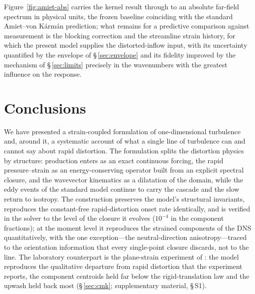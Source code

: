 \documentclass[lineno]{JFM-FLM_Au}
\begin{document}
Figure~\ref{fig:amiet-abs} carries the kernel result through to an
absolute far-field spectrum in physical units, the frozen baseline
coinciding with the standard Amiet--von K\'arm\'an prediction; what
remains for a predictive comparison against measurement is the
blocking correction and the streamline strain history, for which the
present model supplies the distorted-inflow input, with its
uncertainty quantified by the envelope of \S\,\ref{sec:envelope} and
its fidelity improved by the mechanism of \S\,\ref{sec:limits}
precisely in the wavenumbers with the greatest influence on the response.


\section{Conclusions}\label{sec:conclusions}

We have presented a strain-coupled formulation of one-dimensional
turbulence and, around it, a systematic account of what a single line of
turbulence can and cannot say about rapid distortion. The formulation
splits the distortion physics by structure: production enters as an
exact continuous forcing, the rapid pressure--strain as an
energy-conserving operator built from an explicit spectral closure, and
the wavevector kinematics as a dilatation of the domain, while the eddy
events of the standard model continue to carry the cascade and the slow
return to isotropy. The construction preserves the model's structural
invariants, reproduces the constant-free rapid-distortion onset rate
identically, and is verified in the solver to the level of the closure
it evolves ($10^{-4}$ in the component fractions); at the moment level
it reproduces the strained components of the \citet{LeeReynolds1985}
DNS quantitatively, with the one exception---the neutral-direction
anisotropy---traced to the orientation information that every
single-point closure discards, not to the line. The laboratory
counterpart is the plane-strain experiment of
\citet{ChenMeneveauKatz2006}: the model reproduces the qualitative
departure from rapid distortion that the experiment reports, the
component centroids held far below the rigid-translation law and the
upwash held back most (\S\,\ref{sec:cmk}; supplementary material,
\S\,S1).
\end{document}
